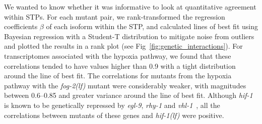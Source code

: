 \documentclass[10pt, onecolumn]{article}
\newcommand{\gene}[1]{\emph{#1}}
\newcommand{\fog}{\emph{\mbox{fog-2(lf)}}}
\newcommand{\egl}{\emph{\mbox{egl-9}(lf)}}
\newcommand{\rhy}{\emph{\mbox{rhy-1}(lf)}}
\newcommand{\hif}{\emph{\mbox{hif-1(lf)}}}
\newcommand{\egln}{2,549}
\newcommand{\rhyn}{3,005}
\begin{document}
We wanted to know whether it was informative to look at quantitative agreement
within STPs. For each mutant pair, we rank-transformed the regression
coefficients $\beta$ of each isoform within the STP, and calculated lines of best
fit using Bayesian regression with a Student-T distribution to mitigate noise
from outliers and plotted the results in a rank plot (see
Fig~\ref{fig:genetic_interactions}). For transcriptomes associated with the
hypoxia pathway, we found that these correlations tended to have values higher
than 0.9 with a tight distribution around the line of best fit. The correlations
for mutants from the hypoxia pathway with the \fog{} mutant were considerably
weaker, with magnitudes between 0.6--0.85 and greater variance around the line
of best fit. Although \gene{hif-1} is known to be genetically repressed by
\gene{egl-9}, \gene{rhy-1} and \gene{vhl-1}~\cite{Epstein2001,Shen2006}, all
the correlations between mutants of these genes and \hif{} were positive.

%
%
\end{document}
